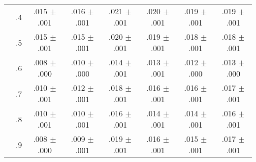 \begin{tabular}{cccccccc}
 & .4 & .015 $\pm$ .001 & .016 $\pm$ .001 & .021 $\pm$ .001 & .020 $\pm$ .001 & .019 $\pm$ .001 & .019 $\pm$ .001 \\
 & .5 & .015 $\pm$ .001 & .015 $\pm$ .001 & .020 $\pm$ .001 & .019 $\pm$ .001 & .018 $\pm$ .001 & .018 $\pm$ .001 \\
 & .6 & .008 $\pm$ .000 & .010 $\pm$ .000 & .014 $\pm$ .001 & .013 $\pm$ .001 & .012 $\pm$ .000 & .013 $\pm$ .000 \\
 & .7 & .010 $\pm$ .001 & .012 $\pm$ .001 & .018 $\pm$ .001 & .016 $\pm$ .001 & .016 $\pm$ .001 & .017 $\pm$ .001 \\
 & .8 & .010 $\pm$ .001 & .010 $\pm$ .001 & .016 $\pm$ .001 & .014 $\pm$ .001 & .014 $\pm$ .001 & .016 $\pm$ .001 \\
 & .9 & .008 $\pm$ .000 & .009 $\pm$ .001 & .019 $\pm$ .001 & .016 $\pm$ .001 & .015 $\pm$ .001 & .017 $\pm$ .001 \\
\bottomrule
\end{tabular}